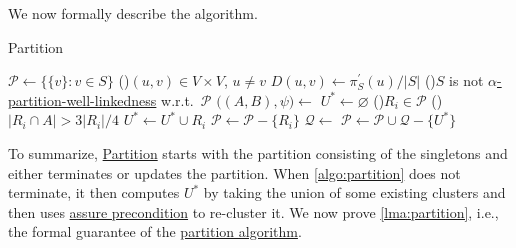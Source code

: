 We now formally describe the algorithm.

\begin{algorithm}[H]\label{algo:partition}
	\DontPrintSemicolon{}
	\caption{Partition}

	\BlankLine

	\(\mathcal{P} \gets \{ \{ v \} \colon v \in S \} \)\;
	\;
	\For(){\((u, v) \in V \times V\), \(u \neq v\)}{
		\(D(u, v)\gets \pi ^{\prime} _S(u) / \lvert S \rvert \)\;
	}
	\;
	\While(){\(S\) is not \hyperref[def:partition-and-boundary-well-linked]{\(\alpha \)-partition-well-linkedness} w.r.t.\ \(\mathcal{P} \)}{
		\(\big((A, B), \psi \big) \gets\)
		\(U^{\ast} \gets \varnothing \)\;
		\For(){\(R_i \in \mathcal{P} \)}{
			\If(){\(\lvert R_i \cap A \rvert > 3 \lvert R_i \rvert / 4\)}{
				\(U^{\ast} \gets U^{\ast} \cup R_i\)\;
				\(\mathcal{P} \gets \mathcal{P} - \{ R_i \} \)\;
			}
		}
		\(\mathcal{Q} \gets\)\label{algo:partition-assure-precondition}\;
		\(\mathcal{P} \gets \mathcal{P} \cup \mathcal{Q} - \{U^{\ast} \}\)\label{algo:partition-new-partition}\;
	}
	\;
\end{algorithm}

To summarize, \hyperref[algo:partition]{Partition} starts with the partition consisting of the singletons and either terminates or updates the partition. When \autoref{algo:partition} does not terminate, it then computes \(U^{\ast} \) by taking the union of some existing clusters and then uses \hyperref[algo:assure-precondition]{assure precondition} to re-cluster it. We now prove \autoref{lma:partition}, i.e., the formal guarantee of the \hyperref[algo:partition]{partition algorithm}.

